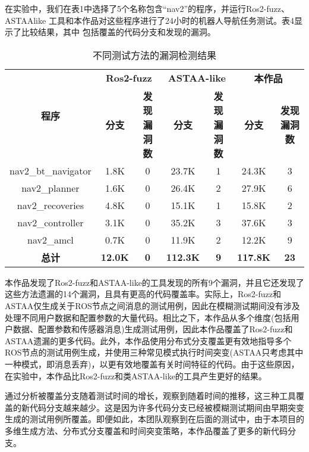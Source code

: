 在实验中，我们在表1中选择了5个名称包含``nav2''的程序，并运行Ros2-fuzz、ASTAAlike
工具和本作品对这些程序进行了24小时的机器人导航任务测试。表4显示了比较结果，其中
包括覆盖的代码分支和发现的漏洞。
\begin{table}[H]
	\small
	\caption{不同测试方法的漏洞检测结果}
	\centering
	\begin{tabular}{ccccccc}
		\hline
		\multirow{2}{*}{\textbf{程序}} & \multicolumn{2}{c}{\textbf{Ros2-fuzz}} & \multicolumn{2}{c}{\textbf{ASTAA-like}} & \multicolumn{2}{c}{\textbf{本作品}} \\
		\cline{2-7}
		& \textbf{分支} & \textbf{发现漏洞数} & \textbf{分支} & \textbf{发现漏洞数} & \textbf{分支} & \textbf{发现漏洞数} \\
		\hline
		nav2\_bt\_navigator & 1.8K & 0 & 23.7K & 1 & 24.3K & 3 \\
		nav2\_planner & 1.6K & 0 & 26.4K & 2 & 27.9K & 6 \\
		nav2\_recoveries & 4.8K & 0 & 15.1K & 1 & 15.8K & 2 \\
		nav2\_controller & 3.1K & 0 & 35.2K & 3 & 37.6K & 3 \\
		nav2\_amcl & 0.7K & 0 & 11.9K & 2 & 12.2K & 9 \\
		\textbf{总计} & \textbf{12.0K} & \textbf{0} & \textbf{112.3K} & \textbf{9} & \textbf{117.8K} & \textbf{23} \\
		\hline
	\end{tabular}
\end{table}
本作品发现了Ros2-fuzz和ASTAA-like的工具发现的所有9个漏洞，并且它还发现了这些方法遗漏的14个漏洞，且具有更高的代码覆盖率。实际上，Ros2-fuzz和ASTAA仅生成关于ROS节点之间消息的测试用例，因此在模糊测试期间没有涉及处理不同用户数据和配置参数的大量代码。相比之下，本作品从多个维度(包括用户数据、配置参数和传感器消息)生成测试用例，因此本作品覆盖了Ros2-fuzz和ASTAA遗漏的更多代码。此外，本作品使用分布式分支覆盖更有效地指导多个ROS节点的测试用例生成，并使用三种常见模式执行时间突变(ASTAA只考虑其中一种模式，即消息丢弃)，以更有效地覆盖有关时间特征的代码。由于这些原因，在实验中，本作品比Ros2-fuzz和类ASTAA-like的工具产生更好的结果。

通过分析被覆盖分支随着测试时间的增长，观察到随着时间的推移，这三种工具覆盖的新代码分支越来越少。这是因为许多代码分支已经被模糊测试期间由早期突变生成的测试用例所覆盖。即便如此，本团队观察到在后面的测试中，由于本项目的多维生成方法、分布式分支覆盖和时间突变策略，本作品覆盖了更多的新代码分支。

